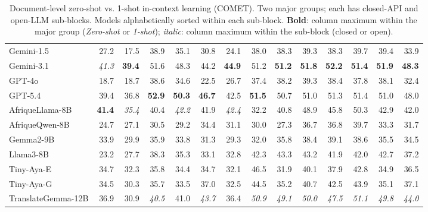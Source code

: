 \begin{table}[t]
\begin{tabular}{lrrrrrrrrrrrrr}
\midrule
Gemini-1.5 & 27.2 & 17.5 & 38.9 & 35.1 & 30.8 & 24.1 & 38.0 & 38.3 & 39.3 & 38.3 & 39.7 & 39.4 & 33.9 \\
Gemini-3.1 & \emph{41.3} & \textbf{39.4} & 51.6 & 48.3 & 44.2 & \textbf{44.9} & 51.2 & \textbf{51.2} & \textbf{51.8} & \textbf{52.2} & \textbf{51.4} & \textbf{51.9} & \textbf{48.3} \\
GPT-4o & 18.7 & 18.7 & 38.6 & 34.6 & 22.5 & 26.7 & 37.4 & 38.2 & 39.3 & 38.4 & 37.8 & 38.1 & 32.4 \\
GPT-5.4 & 39.4 & 36.8 & \textbf{52.9} & \textbf{50.3} & \textbf{46.7} & 42.5 & \textbf{51.5} & 50.7 & 51.0 & 51.3 & 51.4 & 51.0 & 48.0 \\
\midrule
AfriqueLlama-8B & \textbf{41.4} & \emph{35.4} & 40.4 & \emph{42.2} & 41.9 & \emph{42.4} & 32.2 & 40.8 & 48.9 & 45.8 & 50.3 & 42.9 & 42.0 \\
AfriqueQwen-8B & 24.7 & 27.1 & 30.5 & 29.2 & 34.4 & 31.1 & 30.0 & 27.3 & 36.7 & 36.8 & 39.7 & 33.3 & 31.7 \\
Gemma2-9B & 33.9 & 29.9 & 35.9 & 33.8 & 31.3 & 29.3 & 32.0 & 35.8 & 38.4 & 39.1 & 38.6 & 35.5 & 34.5 \\
Llama3-8B & 23.2 & 27.7 & 38.3 & 35.3 & 33.1 & 32.8 & 42.3 & 43.3 & 43.2 & 41.9 & 42.0 & 42.7 & 37.2 \\
Tiny-Aya-E & 34.7 & 32.3 & 35.8 & 34.4 & 34.7 & 32.1 & 46.5 & 31.9 & 40.1 & 37.9 & 42.8 & 34.9 & 36.5 \\
Tiny-Aya-G & 34.5 & 30.3 & 35.7 & 33.5 & 37.0 & 32.5 & 44.5 & 35.2 & 40.7 & 42.5 & 43.9 & 35.1 & 37.1 \\
TranslateGemma-12B & 36.9 & 30.9 & \emph{40.5} & 41.0 & \emph{43.7} & 36.4 & \emph{50.9} & \emph{49.1} & \emph{50.0} & \emph{47.5} & \emph{51.1} & \emph{49.8} & \emph{44.0} \\
\bottomrule
\end{tabular}
\caption{Document-level zero-shot vs. 1-shot in-context learning (COMET). Two major groups; each has closed-API and open-LLM sub-blocks. Models alphabetically sorted within each sub-block. \textbf{Bold}: column maximum within the major group (\textit{Zero-shot} or \textit{1-shot}); \emph{italic}: column maximum within the sub-block (closed or open).}
\label{tab:doc_comet}
\end{table}
